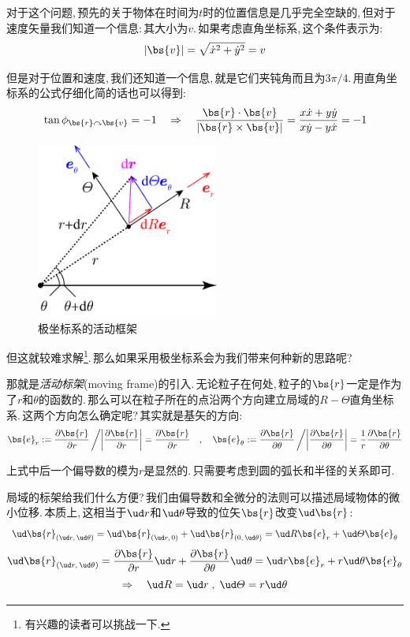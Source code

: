 对于这个问题,\,预先的关于物体在时间为$t$时的位置信息是几乎完全空缺的,\,但对于速度矢量我们知道一个信息:\,其大小为$v$.\,如果考虑直角坐标系,\,这个条件表示为:
\[|\bs{v}|=\sqrt{\dot{x}^2+\dot{y}^2}=v\]

但是对于位置和速度,\,我们还知道一个信息,\,就是它们夹钝角而且为$3\pi/4$.\,用直角坐标系的公式仔细化简的话也可以得到:
\[\tan \phi_{\bs{r}\curvearrowright \bs{v}}=-1\quad \Rightarrow \quad \frac{\bs{r}\cdot\bs{v}}{|\bs{r}\times \bs{v}|}=\frac{x\dot{x}+y\dot{y}}{x\dot{y}-y\dot{x}}=-1\]

\begin{figure}\label{6-1-6}
\vspace{-0.4cm}
\centering
\includegraphics[width=6cm]{image/6-1-6.png}
\caption{极坐标系的活动框架}
\end{figure}
但这就较难求解\footnote{有兴趣的读者可以挑战一下.}.\,那么如果采用极坐标系会为我们带来何种新的思路呢?

那就是\emph{活动标架}(moving frame)的引入.\,无论粒子在何处,\,粒子的$\bs{r}$一定是作为了$r$和$\theta$的函数的.\,那么可以在粒子所在的点沿两个方向建立局域的$R-\varTheta$直角坐标系.\,这两个方向怎么确定呢?\,其实就是基矢的方向:
\[\bs{e}_r:=\frac{\partial\bs{r}}{\partial r}\left/\middle|\frac{\partial\bs{r}}{\partial r}\right|=\frac{\partial\bs{r}}{\partial r}\quad,\quad \bs{e}_\theta:=\frac{\partial\bs{r}}{\partial \theta}\left/\middle|\frac{\partial\bs{r}}{\partial \theta}\right|=\frac{1}{r}\frac{\partial\bs{r}}{\partial \theta}\]

上式中后一个偏导数的模为$r$是显然的.\,只需要考虑到圆的弧长和半径的关系即可.

局域的标架给我们什么方便?\,我们由偏导数和全微分的法则可以描述局域物体的微小位移.\,本质上,\,这相当于$\ud r$和$\ud \theta$导致的位矢$\bs{r}$改变$\ud \bs{r}$:
\[\ud \bs{r}_{(\ud r,\,\ud \theta)}=\ud \bs{r}_{(\ud r,\,0)}+\ud \bs{r}_{(0,\,\ud \theta)}=\ud R\bs{e}_r+\ud \varTheta\bs{e}_\theta\]
\[\ud \bs{r}_{(\ud r,\,\ud \theta)}=\frac{\partial \bs{r}}{\partial r}\ud r+\frac{\partial \bs{r}}{\partial \theta}\ud \theta=\ud r\bs{e}_r+r\ud \theta \bs{e}_\theta\]
\[\Rightarrow \quad \ud R=\ud r\;,\;\ud \varTheta=r\ud \theta\]

